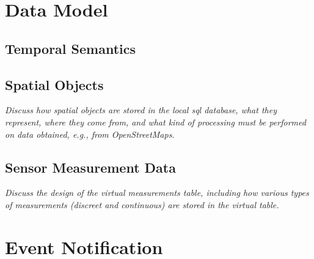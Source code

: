 \documentclass[conference,10pt]{IEEEtran}
\begin{document}
\section{Data Model}\label{sec:data-model}

\subsection{Temporal Semantics}\label{sec:temporal-semantics}


\subsection{Spatial Objects}\label{sec:spatial-objects}

\textit{Discuss how spatial objects are stored in the local \gls{sql} database, what they represent, where they come from, and what kind of processing  must be performed on data obtained, e.g., from OpenStreetMaps}.

\subsection{Sensor Measurement Data}\label{sec:sensor-measurements}

\textit{Discuss the design of the virtual measurements table, including how various types of measurements (discreet and continuous) are stored in the virtual table.}

\section{Event Notification}\label{sec:event-notification}
\end{document}
